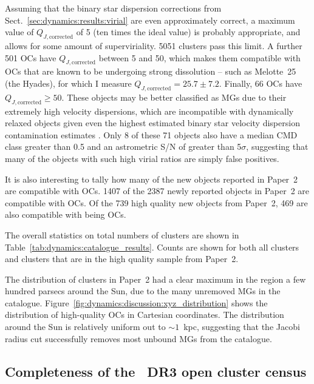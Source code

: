 Assuming that the binary star dispersion corrections from Sect.~\ref{sec:dynamics:results:virial} are even approximately correct, a maximum value of $Q_{J,\text{corrected}}$ of 5 (ten times the ideal value) is probably appropriate, and allows for some amount of superviriality. 5051 clusters pass this limit. A further 501 OCs have $Q_{J,\text{corrected}}$ between 5 and 50, which makes them compatible with OCs that are known to be undergoing strong dissolution -- such as Melotte~25 (the Hyades), for which I measure $Q_{J,\text{corrected}}=25.7 \pm 7.2$. Finally, 66 OCs have $Q_{J,\text{corrected}}\geq50$. These objects may be better classified as MGs due to their extremely high velocity dispersions, which are incompatible with dynamically relaxed objects given even the highest estimated binary star velocity dispersion contamination estimates \citep{rastello_effect_binarity_2020}. Only 8 of these 71 objects also have a median CMD class greater than 0.5 and an astrometric S/N of greater than 5$\sigma$, suggesting that many of the objects with such high virial ratios are simply false positives.

It is also interesting to tally how many of the new objects reported in Paper~2 are compatible with OCs. 1407 of the 2387 newly reported objects in Paper~2 are compatible with OCs. Of the 739 high quality new objects from Paper~2, 469 are also compatible with being OCs.

The overall statistics on total numbers of clusters are shown in Table~\ref{tab:dynamics:catalogue_results}. Counts are shown for both all clusters and clusters that are in the high quality sample from Paper~2.

The distribution of clusters in Paper~2 had a clear maximum in the region a few hundred parsecs around the Sun, due to the many unremoved MGs in the catalogue. Figure~\ref{fig:dynamics:discussion:xyz_distribution} shows the distribution of high-quality OCs in Cartesian coordinates. The distribution around the Sun is relatively uniform out to $\sim1$~kpc, suggesting that the Jacobi radius cut successfully removes most unbound MGs from the catalogue.


\subsection{Completeness of the \gaia\ DR3 open cluster census}
\label{sec:dynamics:results:completeness}

